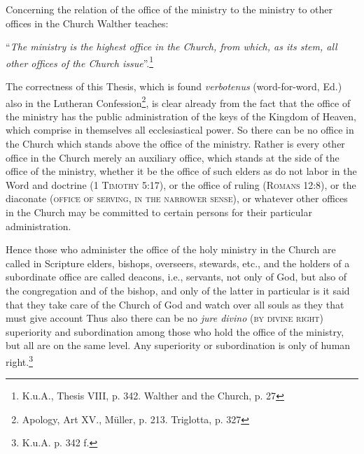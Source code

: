 Concerning the relation of the office of the ministry to the ministry to other offices in the Church Walther teaches: \begin{displayquote}“\textit{The ministry is the highest office in the Church, from which, as its stem, all other offices of the Church issue}”.\footnote{K.u.A., Thesis VIII, p. 342. Walther and the Church, p. 27}\end{displayquote}  The correctness of this Thesis, which is found \textit{verbotenus} {\scriptsize (word-for-word, Ed.)} also in the Lutheran Confession\footnote{Apology, Art XV., Müller, p. 213. Triglotta, p. 327}, is clear already from the fact that the office of the ministry has the public administration of the keys of the Kingdom of Heaven, which comprise in themselves all ecclesiastical power.  So there can be no office in the Church which stands above the office of the ministry.  Rather is every other office in the Church merely an auxiliary office, which stands at the side of the office of the ministry, whether it be the office of such elders as do not labor in the Word and doctrine {\scriptsize\textsc{(1 Timothy 5:17)}}, or the office of ruling {\scriptsize\textsc{(Romans 12:8)}}, or the diaconate {\scriptsize\textsc{(office of serving, in the narrower sense)}}, or whatever other offices in the Church may be committed to certain persons for their particular administration.  \par Hence those who administer the office of the holy ministry in the Church are called in Scripture elders, bishops, overseers, stewards, etc., and the holders of a subordinate office are called deacons, i.e., servants, not only of God, but also of the congregation and of the bishop, and only of the latter in particular is it said that they take care of the Church of God and watch over all souls as they that must give account   Thus also there can be no \textit{jure divino} {\scriptsize\textsc{(by divine right)}} superiority and subordination among those who hold the office of the ministry, but all are on the same level.  Any superiority or subordination is only of human right.\footnote{ K.u.A. p. 342 f.}

